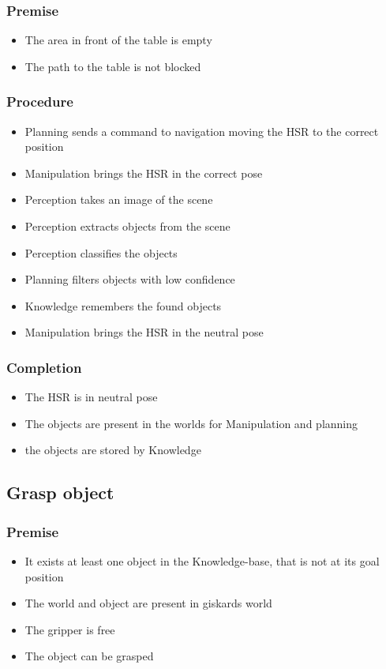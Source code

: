\documentclass[main.tex]{subfiles}
\begin{document}
	\subsubsection{Premise}
	\begin{itemize}
		\item The area in front of the table is empty 
		\item The path to the table is not blocked
	\end{itemize} 
	
	\subsubsection{Procedure}
	\begin{itemize}			
		\item Planning sends a command to navigation moving the HSR to the correct position
		\item Manipulation brings the HSR in the correct pose
		\item Perception takes an image of the scene
		\item Perception extracts objects from the scene
		\item Perception classifies the objects	
		\item Planning filters objects with low confidence
		\item Knowledge remembers the found objects
		\item Manipulation brings the HSR in the neutral pose	 				
	\end{itemize}
	
	\subsubsection{Completion}
	\begin{itemize}
		\item The HSR is in neutral pose
		\item The objects are present in the worlds for Manipulation and planning
		\item the objects are stored by Knowledge				
	\end{itemize}
			
	\subsection{Grasp object}
	
	\subsubsection{Premise}
	\begin{itemize}
		\item It exists at least one object in the Knowledge-base, that is not at its goal position
		\item The world and object are present in giskards world
		\item The gripper is free
		\item The object can be grasped 
	\end{itemize} 
	
\end{document}
